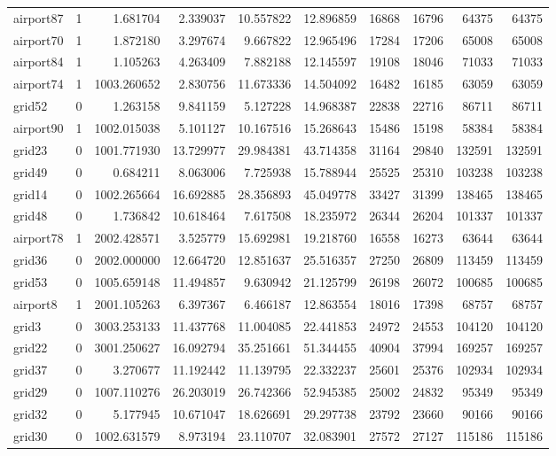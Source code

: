 \begin{longtable}{|l|r|r|r|r|r|r|r|r|r|}
airport87 & 1 & 1.681704 & 2.339037 & 10.557822 & 12.896859 & 16868 & 16796 & 64375 & 64375 \\
airport70 & 1 & 1.872180 & 3.297674 & 9.667822 & 12.965496 & 17284 & 17206 & 65008 & 65008 \\
airport84 & 1 & 1.105263 & 4.263409 & 7.882188 & 12.145597 & 19108 & 18046 & 71033 & 71033 \\
airport74 & 1 & 1003.260652 & 2.830756 & 11.673336 & 14.504092 & 16482 & 16185 & 63059 & 63059 \\
grid52 & 0 & 1.263158 & 9.841159 & 5.127228 & 14.968387 & 22838 & 22716 & 86711 & 86711 \\
airport90 & 1 & 1002.015038 & 5.101127 & 10.167516 & 15.268643 & 15486 & 15198 & 58384 & 58384 \\
grid23 & 0 & 1001.771930 & 13.729977 & 29.984381 & 43.714358 & 31164 & 29840 & 132591 & 132591 \\
grid49 & 0 & 0.684211 & 8.063006 & 7.725938 & 15.788944 & 25525 & 25310 & 103238 & 103238 \\
grid14 & 0 & 1002.265664 & 16.692885 & 28.356893 & 45.049778 & 33427 & 31399 & 138465 & 138465 \\
grid48 & 0 & 1.736842 & 10.618464 & 7.617508 & 18.235972 & 26344 & 26204 & 101337 & 101337 \\
airport78 & 1 & 2002.428571 & 3.525779 & 15.692981 & 19.218760 & 16558 & 16273 & 63644 & 63644 \\
grid36 & 0 & 2002.000000 & 12.664720 & 12.851637 & 25.516357 & 27250 & 26809 & 113459 & 113459 \\
grid53 & 0 & 1005.659148 & 11.494857 & 9.630942 & 21.125799 & 26198 & 26072 & 100685 & 100685 \\
airport8 & 1 & 2001.105263 & 6.397367 & 6.466187 & 12.863554 & 18016 & 17398 & 68757 & 68757 \\
grid3 & 0 & 3003.253133 & 11.437768 & 11.004085 & 22.441853 & 24972 & 24553 & 104120 & 104120 \\
grid22 & 0 & 3001.250627 & 16.092794 & 35.251661 & 51.344455 & 40904 & 37994 & 169257 & 169257 \\
grid37 & 0 & 3.270677 & 11.192442 & 11.139795 & 22.332237 & 25601 & 25376 & 102934 & 102934 \\
grid29 & 0 & 1007.110276 & 26.203019 & 26.742366 & 52.945385 & 25002 & 24832 & 95349 & 95349 \\
grid32 & 0 & 5.177945 & 10.671047 & 18.626691 & 29.297738 & 23792 & 23660 & 90166 & 90166 \\
grid30 & 0 & 1002.631579 & 8.973194 & 23.110707 & 32.083901 & 27572 & 27127 & 115186 & 115186 \\

\end{longtable}
